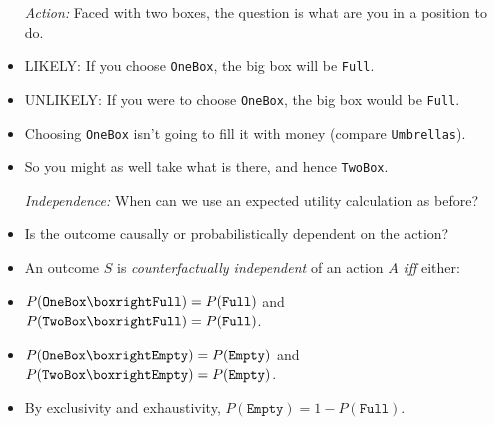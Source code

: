 \documentclass[a4paper, 11pt]{article} %
\begin{document}
\begin{itemize}
  \item[\it Action:] Faced with two boxes, the question is what are you in a position to do.
    \item LIKELY: If you choose \texttt{OneBox}, the big box will be \texttt{Full}.
    \item UNLIKELY: If you were to choose \texttt{OneBox}, the big box would be \texttt{Full}.
    \item Choosing \texttt{OneBox} isn't going to fill it with money (compare \texttt{Umbrellas}).
    \item So you might as well take what is there, and hence \texttt{TwoBox}.
  \item[\it Independence:] When can we use an expected utility calculation as before?
    \item Is the outcome causally or probabilistically dependent on the action?
    \item An outcome $S$ is \textit{counterfactually independent} of an action $A$ \textit{iff} either: 
    \vspace{-.1in}
    \begin{enumerate}
    \end{enumerate}
    \vspace{-.1in}
    \item $P(\texttt{OneBox} \boxright \texttt{Full}) = P(\texttt{Full})$ and $P(\texttt{TwoBox} \boxright \texttt{Full}) = P(\texttt{Full})$.
    \item $P(\texttt{OneBox} \boxright \texttt{Empty}) = P(\texttt{Empty})$ and $P(\texttt{TwoBox} \boxright \texttt{Empty}) = P(\texttt{Empty})$.
    \item By exclusivity and exhaustivity, $P(\texttt{Empty}) = 1 - P(\texttt{Full})$.

\end{itemize}
\end{document}

